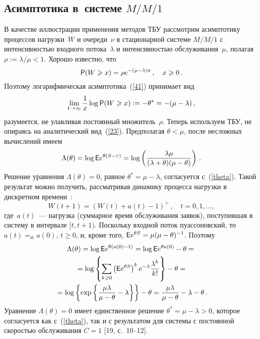 \begin{multicols}{2}
\subsection{Асимптотика в~системе $M/M/1$}

В качестве иллюстрации применения методов ТБУ рассмотрим
асимптотику процессов нагрузки~$W$ и очереди~$\nu$ в
стационарной сис\-те\-ме $M/M/1$ с интенсивностью входного потока~$\lambda$ и интенсивностью обслуживания~$\mu$, полагая
$\rho:=\lambda/\mu<1$. Хорошо известно, что
\begin{equation}
{\sf P}(W\geqslant x)=\rho e^{-(\mu-\lambda)x}\,,\quad x\geqslant 0\,.
\label{23}
\end{equation}
Поэтому логарифмическая асимптотика~(\ref{41}) принимает вид
\begin{equation}
\lim_{t\to \infty}\displaystyle\frac{\displaystyle 1\mathstrut}{\displaystyle x\mathstrut}\log {\sf P}(W\geqslant x):=-\theta^*=-(\mu-\lambda)\,,
\label{theta}
\end{equation}
разумеется, не улавливая постоянный множитель~$\rho$. Теперь
используем ТБУ, не опираясь на аналитический вид~(\ref{23}).
 Предполагая $\theta<\mu$, после несложных вычислений имеем
\begin{equation*}
\Lambda(\theta)=\log{\sf E} e^{\theta(S-\tau)} = \log
\left( \displaystyle\frac{\displaystyle \lambda\mu\mathstrut}{\displaystyle  (\lambda+\theta)(\mu - \theta)\mathstrut}\right)\,.
\end{equation*}
Решение уравнения $\Lambda(\theta) = 0$, равное $\theta^*= \mu -\lambda$,
согласуется с~(\ref{theta}). Такой результат можно получить, рассматривая
динамику процесса нагрузки в дискретном времени~\cite{BQ}:
\begin{equation*}
W(t+1)=(W(t)+a(t)-1)^+\,,\quad t=0,1,\ldots,
\end{equation*}
где~$a(t)$~--- нагрузка (суммарное время обслуживания заявок),
поступившая в систему в интервале $[t,t+1)$.
 Поскольку входной поток пуассоновский, то $a(t)=_{\mathrm{st}}a(0)$, $t\ge 0$,
 и, кроме того, ${\sf E} e^{\theta S}=\mu(\mu-\theta)^{-1}$. Поэтому
\begin{multline*}
\Lambda(\theta) = \log {\sf E} e^{\theta (a(0)-1)}=\log{\sf E} e^{\theta a(0)}-\theta ={}\\
{}=
\log \left\{ \sum\limits_{k\geqslant 0}\left({\sf E} e^{\theta S}\right)^k
e^{-\lambda}\displaystyle\frac{\displaystyle \lambda^k\mathstrut}{\displaystyle k!\mathstrut}\right\}-\theta={}\\
{}= \log\left\{\exp \left\{
\displaystyle\frac{\displaystyle \mu\lambda\mathstrut}{\displaystyle \mu-\theta\mathstrut}-\lambda\right\} \right\}-\theta =
\displaystyle\frac{\displaystyle \mu\lambda\mathstrut}{\displaystyle \mu-\theta\mathstrut}-\lambda -\theta\,.
\end{multline*}
Уравнение $\Lambda(\theta)=0$ имеет единственное решение $\theta^*
=\mu-\lambda>0$, которое согласуется как с~(\ref{theta}), так и с
результатом для системы с постоянной скоростью обслуживания $C=1$
[19, с.~10--12].


\end{multicols}
